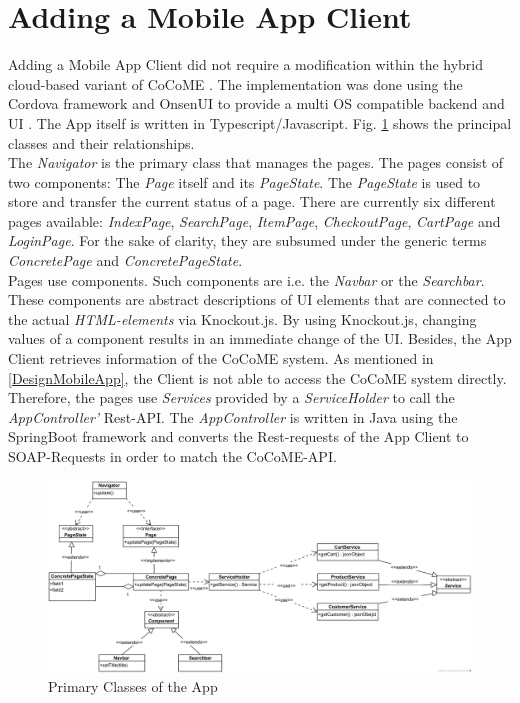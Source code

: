  \section{Adding a Mobile App Client}\label{AppImplementation}
 Adding a Mobile App Client did not require a modification within the hybrid cloud-based variant of CoCoME \cite{HeinrichRostamiReussner2016_1000052688}. The implementation was done using the Cordova framework and OnsenUI to provide a multi OS compatible backend and UI \cite{schnabel}. The App itself is written in Typescript/Javascript. Fig. \ref{App_ClassDiagram} shows the principal classes and their relationships.
 \\
  The \textit{Navigator} is the primary class that manages the pages. The pages consist of two components: The \textit{Page} itself and its \textit{PageState}. The \textit{PageState} is used to store and transfer the current status of a page. There are currently six different pages available: \textit{IndexPage}, \textit{SearchPage}, \textit{ItemPage}, \textit{CheckoutPage}, \textit{CartPage} and \textit{LoginPage}. For the sake of clarity, they are subsumed under the generic terms \textit{ConcretePage} and \textit{ConcretePageState}. 
  \\
  Pages use components. Such components are i.e. the \textit{Navbar} or the \textit{Searchbar}. These components are abstract descriptions of UI elements that are connected to the actual \textit{HTML-elements} via Knockout.js. By using Knockout.js, changing values of a component results in an immediate change of the UI. 
  Besides, the App Client retrieves information of the CoCoME system.  As mentioned in \ref{DesignMobileApp}, the Client is not able to access the CoCoME system directly. Therefore, the pages use \textit{Services} provided by a \textit{ServiceHolder} to call the \textit{AppController'} Rest-API. The \textit{AppController} is written in Java using the SpringBoot framework and converts the Rest-requests of the App Client to SOAP-Requests in order to match the CoCoME-API. 
  
  
   \begin{figure}
  	\includegraphics[width=\textwidth]{img/appBasicClass.png}
  	\caption{Primary Classes of the App}
  	\label{App_ClassDiagram}
  \end{figure}

